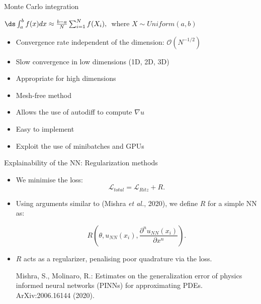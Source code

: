 \begin{frame}{Monte Carlo integration}
\begin{center}
$
\ds \int_a^b f(x) dx \approx \frac{b-a}{N} \sum_{i=1}^N f(X_i), \;
$
where $X \sim Uniform(a,b)$
\end{center}

\begin{itemize}
\item[\tickYes] Convergence rate independent of the dimension: $\mathcal{O}(N^{-1/2})$
\item[\tickNo] Slow convergence in low dimensions (1D, 2D, 3D)
\item[\tickYes] Appropriate for high dimensions
\item[\tickYes] Mesh-free method
\item[\tickYes] Allows the use of autodiff to compute $\nabla u$
\item[\tickYes] Easy to implement
\item[\tickYes] Exploit the use of minibatches and GPUs
\end{itemize}
\end{frame}


\begin{frame}{Explainability of the NN: Regularization methods}
\centering

\begin{itemize}
\item We  minimise the loss:
$$\mathcal{L}_{total} = \mathcal{L}_{Ritz}+R.$$
\vspace{0.2cm}

\item Using arguments similar to (Mishra \textit{et al.}, 2020), we define $R$ for a simple NN as:

\begin{equation*}
R\left(\theta, u_{NN}(x_i), \dfrac{\partial^{n}u_{NN}(x_i) }{\partial x^{n}} \right).
\end{equation*}


\vspace{0.2cm}
\item $R$ acts as a regularizer, penalising poor quadrature via the loss. 
%

\vspace{0.5cm}

\begin{thebibliography}{1}
{}Mishra, S., Molinaro, R.: Estimates on the generalization error of physics informed neural
networks (PINNs) for approximating PDEs. ArXiv:2006.16144 (2020).
\end{thebibliography}
\end{itemize}
\end{frame}


